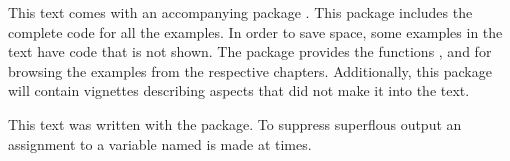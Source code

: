 This text comes with an accompanying package \pkg{\PACKAGENAME}. This
package includes the complete code for all the examples. In order to
save space, some examples in the text have code that is not shown. The
package provides the functions ,
 and  for browsing the
examples from the respective chapters. Additionally, this package will
contain vignettes describing aspects that did not make it into the
text.


This text was written with the  package. To suppress
superflous output an assignment to a variable named  is made
at times.
 


